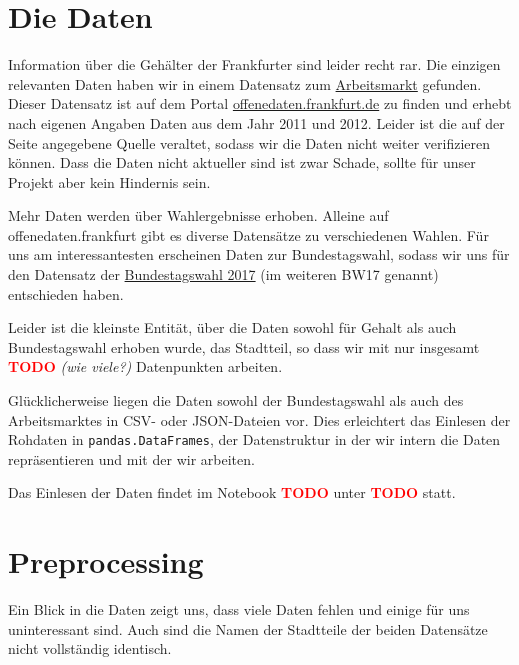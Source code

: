 \documentclass[a4paper,10pt]{scrartcl}
\newcommand{\TODO}{\textcolor{red}{\textbf{TODO }}}
\begin{document}
\section{Die Daten}
Information über die Gehälter der Frankfurter sind leider recht rar. Die einzigen relevanten Daten haben wir in einem Datensatz zum  \href{https://offenedaten.frankfurt.de/dataset/arbeitsmarkt}{Arbeitsmarkt}
gefunden. Dieser Datensatz ist auf dem Portal \href{https://offenedaten.frankfurt.de}{offenedaten.frankfurt.de} zu finden und erhebt nach eigenen Angaben Daten aus dem Jahr 2011 und 2012. Leider ist die auf der Seite angegebene Quelle veraltet, sodass wir die Daten nicht weiter verifizieren können. Dass die Daten nicht aktueller sind ist zwar Schade, sollte für unser Projekt aber kein Hindernis sein. 

Mehr Daten werden über Wahlergebnisse erhoben. Alleine auf offenedaten.frankfurt gibt es diverse Datensätze zu verschiedenen Wahlen. Für uns am interessantesten erscheinen Daten zur Bundestagswahl, sodass wir uns für den Datensatz der \href{https://offenedaten.frankfurt.de/dataset/bundestagswahl-2017-ergebnisse-in-frankfurt-am-main}{Bundestagswahl 2017} (im weiteren BW17 genannt) entschieden haben.

Leider ist die kleinste Entität, über die Daten sowohl für Gehalt als auch Bundestagswahl erhoben wurde, das Stadtteil, so dass wir mit nur insgesamt \TODO\emph{(wie viele?)} Datenpunkten arbeiten.

Glücklicherweise liegen die Daten sowohl der Bundestagswahl als auch des Arbeitsmarktes in CSV- oder JSON-Dateien vor. Dies erleichtert das Einlesen der Rohdaten in \lstinline|pandas.DataFrames|, der Datenstruktur in der wir intern die Daten repräsentieren und mit der wir arbeiten.

Das Einlesen der Daten findet im Notebook \TODO unter \TODO statt.


\section{Preprocessing}
Ein Blick in die Daten zeigt uns, dass viele Daten fehlen und einige für uns uninteressant sind. Auch sind die Namen der Stadtteile der beiden Datensätze nicht vollständig identisch.
\end{document}
